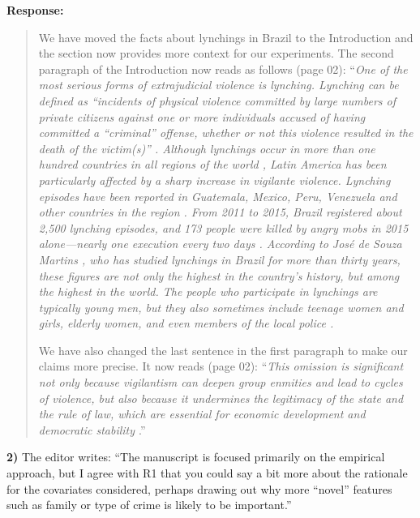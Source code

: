 \documentclass[a4paper,12pt]{article}
\begin{document}
\noindent \textbf{Response:} 
\begin{quote}

We have moved the facts about lynchings in Brazil to the Introduction and 
the section now provides more context for our experiments. The
second paragraph of the Introduction now reads as follows (page 02):
``\textit{One of the most serious forms of extrajudicial violence is lynching.
  Lynching can be defined as ``incidents of physical violence committed by
  large numbers of private citizens against one or more individuals accused of
  having committed a ``criminal'' offense, whether or not this violence
  resulted in the death of the victim(s)'' \citep[645]{godoy2004justice}.
  Although lynchings occur in more than one hundred countries in all regions of
  the world \citep{jung2020lynching,smith2019contradictions}, Latin America has
  been particularly affected by a sharp increase in vigilante violence.
  Lynching episodes have been reported in Guatemala, Mexico, Peru, Venezuela
  and other countries in the region \citep{barbara2015vigilantes,
  cruz2019determinants, godoy2004justice}. From 2011 to 2015, Brazil registered
  about 2,500 lynching episodes, and 173 people were killed by angry mobs in
  2015 alone---nearly one execution every two days
  \citep{barbara2015vigilantes, oliveira2016mob}. According to José de Souza
  Martins \citeyearpar{martins2015linchamentos}, who has studied lynchings in
  Brazil for more than thirty years, these figures are not only the highest in
  the country's history, but among the highest in the world. The people who
participate in lynchings are typically young men, but they also sometimes
include teenage women and girls, elderly women, and even members of the local
police \citep{moura2017linchamentos}.}

We have also changed the last sentence in the first paragraph to make our
claims more precise. It now reads (page 02): ``\textit{This
omission is significant not only because vigilantism can deepen group enmities
and lead to cycles of violence, but also because it undermines the legitimacy
of the state and the rule of law, which are essential for economic development
and democratic stability \citep{jung2020lynching, tankebe2009self}}.''

\end{quote}

\vspace{.3cm}

\noindent \textbf{2)} The editor writes: ``The manuscript is focused primarily
on the empirical approach, but I agree with R1 that you could say a bit more
about the rationale for the covariates considered, perhaps drawing out why more
``novel'' features such as family or type of crime is likely to be important.'' 
\end{document}
